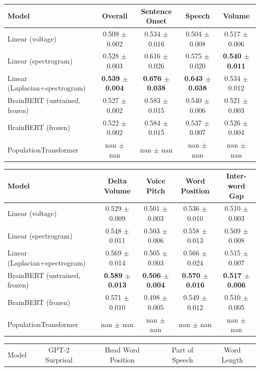 \begin{table}[h]
\centering
\begin{tabular}{lcccc}
\hline
Model & Overall & Sentence Onset & Speech & Volume \\
\hline
Linear (voltage) & 0.509 $\pm$ 0.002 & 0.534 $\pm$ 0.016 & 0.504 $\pm$ 0.008 & 0.517 $\pm$ 0.006 \\
Linear (spectrogram) & 0.528 $\pm$ 0.003 & 0.616 $\pm$ 0.026 & 0.575 $\pm$ 0.020 & \textbf{0.540 $\pm$ 0.011} \\
Linear (Laplacian+spectrogram) & \textbf{0.539 $\pm$ 0.004} & \textbf{0.676 $\pm$ 0.038} & \textbf{0.643 $\pm$ 0.038} & 0.534 $\pm$ 0.012 \\
BrainBERT (untrained, frozen) & 0.527 $\pm$ 0.002 & 0.583 $\pm$ 0.015 & 0.540 $\pm$ 0.006 & 0.521 $\pm$ 0.003 \\
BrainBERT (frozen) & 0.522 $\pm$ 0.002 & 0.584 $\pm$ 0.015 & 0.537 $\pm$ 0.007 & 0.526 $\pm$ 0.004 \\
PopulationTransformer & nan $\pm$ nan & nan $\pm$ nan & nan $\pm$ nan & nan $\pm$ nan \\
\hline
\end{tabular}
\hspace{1em}
\begin{tabular}{lcccc}
\hline
Model & Delta Volume & Voice Pitch & Word Position & Inter-word Gap \\
\hline
Linear (voltage) & 0.529 $\pm$ 0.009 & 0.501 $\pm$ 0.003 & 0.536 $\pm$ 0.010 & 0.510 $\pm$ 0.003 \\
Linear (spectrogram) & 0.548 $\pm$ 0.011 & 0.503 $\pm$ 0.006 & 0.558 $\pm$ 0.013 & 0.509 $\pm$ 0.008 \\
Linear (Laplacian+spectrogram) & 0.569 $\pm$ 0.014 & 0.505 $\pm$ 0.003 & 0.566 $\pm$ 0.024 & 0.515 $\pm$ 0.007 \\
BrainBERT (untrained, frozen) & \textbf{0.589 $\pm$ 0.013} & \textbf{0.506 $\pm$ 0.004} & \textbf{0.570 $\pm$ 0.016} & \textbf{0.517 $\pm$ 0.006} \\
BrainBERT (frozen) & 0.571 $\pm$ 0.010 & 0.498 $\pm$ 0.005 & 0.549 $\pm$ 0.012 & 0.510 $\pm$ 0.005 \\
PopulationTransformer & nan $\pm$ nan & nan $\pm$ nan & nan $\pm$ nan & nan $\pm$ nan \\
\hline
\end{tabular}
\hspace{1em}
\begin{tabular}{lcccc}
\hline
Model & GPT-2 Surprisal & Head Word Position & Part of Speech & Word Length \\

\end{tabular}
\end{table}
